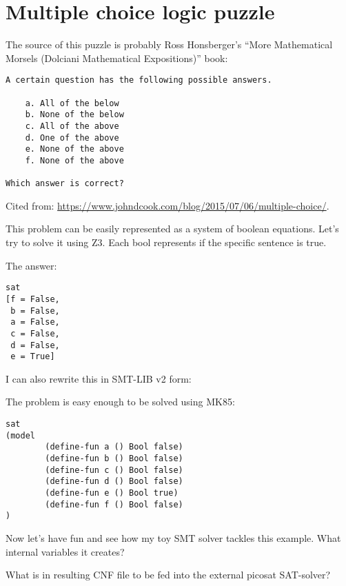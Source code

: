 \section{Multiple choice logic puzzle}

The source of this puzzle is probably Ross Honsberger's ``More Mathematical Morsels (Dolciani Mathematical Expositions)'' book:

\begin{lstlisting}
A certain question has the following possible answers.

    a. All of the below
    b. None of the below
    c. All of the above
    d. One of the above
    e. None of the above
    f. None of the above

Which answer is correct?
\end{lstlisting}

Cited from: \url{https://www.johndcook.com/blog/2015/07/06/multiple-choice/}.

This problem can be easily represented as a system of boolean equations.
Let's try to solve it using Z3. Each bool represents if the specific sentence is true.



The answer:

\begin{lstlisting}
sat
[f = False,
 b = False,
 a = False,
 c = False,
 d = False,
 e = True]
\end{lstlisting}

I can also rewrite this in SMT-LIB v2 form:



The problem is easy enough to be solved using MK85:

\begin{lstlisting}
sat
(model
        (define-fun a () Bool false)
        (define-fun b () Bool false)
        (define-fun c () Bool false)
        (define-fun d () Bool false)
        (define-fun e () Bool true)
        (define-fun f () Bool false)
)
\end{lstlisting}

Now let's have fun and see how my toy SMT solver tackles this example.
What internal variables it creates?



What is in resulting CNF file to be fed into the external picosat SAT-solver?



